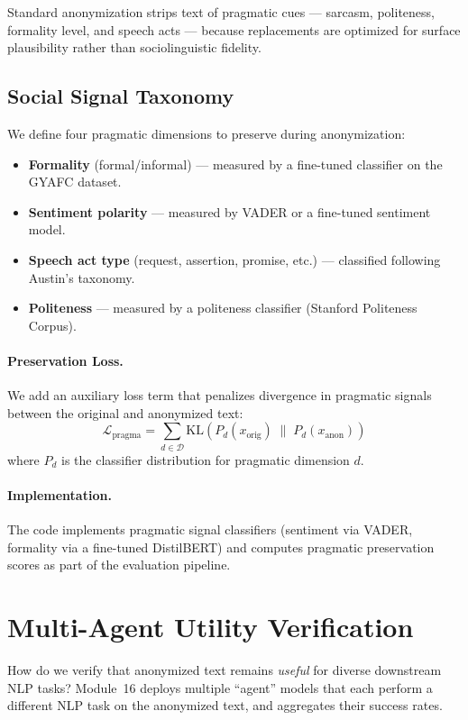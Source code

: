 \documentclass[11pt, a4paper]{article}
\begin{document}
Standard anonymization strips text of pragmatic cues --- sarcasm, politeness, formality level, and speech acts --- because replacements are optimized for surface plausibility rather than sociolinguistic fidelity.

\subsection{Social Signal Taxonomy}

We define four pragmatic dimensions to preserve during anonymization:
\begin{itemize}
  \item \textbf{Formality} (formal/informal) --- measured by a fine-tuned classifier on the GYAFC dataset.
  \item \textbf{Sentiment polarity} --- measured by VADER or a fine-tuned sentiment model.
  \item \textbf{Speech act type} (request, assertion, promise, etc.) --- classified following Austin's taxonomy.
  \item \textbf{Politeness} --- measured by a politeness classifier (Stanford Politeness Corpus).
\end{itemize}

\paragraph{Preservation Loss.}
We add an auxiliary loss term that penalizes divergence in pragmatic signals between the original and anonymized text:
\[
  \mathcal{L}_{\text{pragma}} = \sum_{d \in \mathcal{D}} \text{KL}\!\left( P_d(x_{\text{orig}}) \;\|\; P_d(x_{\text{anon}}) \right)
\]
where $P_d$ is the classifier distribution for pragmatic dimension $d$.

\paragraph{Implementation.}
The code implements pragmatic signal classifiers (sentiment via VADER, formality via a fine-tuned DistilBERT) and computes pragmatic preservation scores as part of the evaluation pipeline.


\section{Multi-Agent Utility Verification}
\label{sec:multiagent}

How do we verify that anonymized text remains \emph{useful} for diverse downstream NLP tasks?  Module~16 deploys multiple ``agent'' models that each perform a different NLP task on the anonymized text, and aggregates their success rates.
\end{document}
